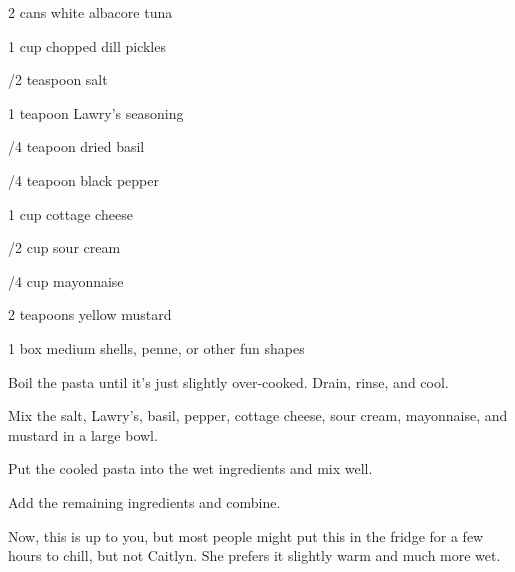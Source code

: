 \begin{IngredientsAndSteps}
    \ListIngredientsAndSteps
    {
        2 cans white albacore tuna

        1 cup chopped dill pickles

        /2 teaspoon salt

        1 teapoon Lawry's seasoning

        /4 teapoon dried basil

        /4 teapoon black pepper

        1 cup cottage cheese

        /2 cup sour cream

        /4 cup mayonnaise

        2 teapoons yellow mustard

        1 box medium shells, penne, or other fun shapes
    }
    {
        Boil the pasta until it's just slightly over-cooked. Drain, rinse, and cool.

        Mix the salt, Lawry's, basil, pepper, cottage cheese, sour cream, mayonnaise, and mustard in
        a large bowl.

        Put the cooled pasta into the wet ingredients and mix well.

        Add the remaining ingredients and combine.

        Now, this is up to you, but most people might put this in the fridge for a few hours to chill,
        but not Caitlyn. She prefers it slightly warm and much more wet.
    }
\end{IngredientsAndSteps}

